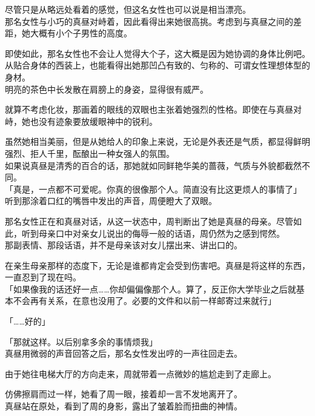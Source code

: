 尽管只是从略远处看着的感觉，但这名女性也可以说是相当漂亮。\\

那名女性与小巧的真昼对峙着，因此看得出来她很高挑。考虑到与真昼之间的差距，她大概有小个子男性的高度。

即使如此，那名女性也不会让人觉得大个子，这大概是因为她协调的身体比例吧。从贴合身体的西装上，也能看得出她那凹凸有致的、匀称的、可谓女性理想体型的身材。\\

明亮的茶色中长发散在肩膀上的身姿，显得很有威严。

就算不考虑化妆，那画着的眼线的双眼也主张着她强烈的性格。即使在与真昼对峙，她也没有迹象要放缓眼神中的锐利。

虽然她相当美丽，但是从她给人的印象上来说，无论是外表还是气质，都显得鲜明强烈、拒人千里，酝酿出一种女强人的氛围。\\

如果说真昼是清秀的百合的话，那她就如同鲜艳华美的蔷薇，气质与外貌都截然不同。\\

「真是，一点都不可爱呢。你真的很像那个人。简直没有比这更烦人的事情了」\\

听到那涂着口红的嘴唇中发出的声音，周便瞪大了双眼。

那名女性正在和真昼对话，从这一状态中，周判断出了她是真昼的母亲。尽管如此，听到母亲口中对亲女儿说出的侮辱一般的话语，周仍然为之感到愕然。\\

那副表情、那段话语，并不是母亲该对女儿摆出来、讲出口的。

在亲生母亲那样的态度下，无论是谁都肯定会受到伤害吧。真昼是将这样的东西，一直忍到了现在吗。\\

「如果像我的话还好一点……你却偏偏像那个人。算了，反正你大学毕业之后就基本不会再有关系，在意也没用了。必要的文件和以前一样邮寄过来就行」

「……好的」

「那就这样。以后别拿多余的事情烦我」\\

真昼用微弱的声音回答之后，那名女性发出哼的一声往回走去。

由于她往电梯大厅的方向走来，周就带着一点微妙的尴尬走到了走廊上。

仿佛擦肩而过一样，她看了周一眼，接着却一言不发地离开了。\\

真昼站在原处，看到了周的身影，露出了皱着脸而扭曲的神情。\\

